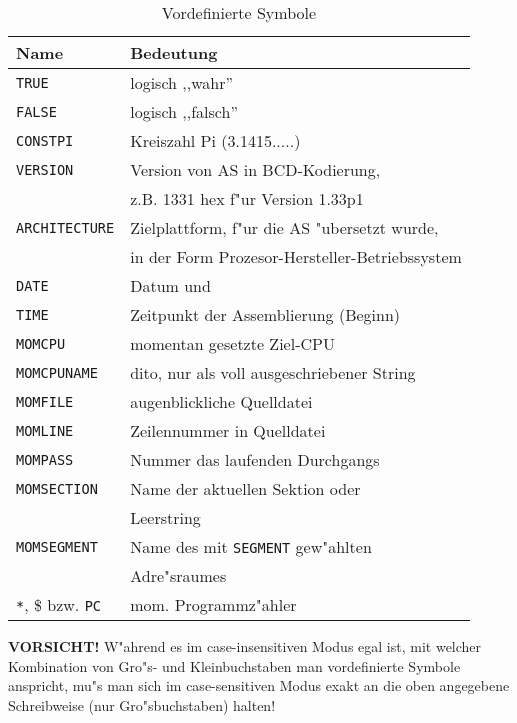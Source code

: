 \documentclass[12pt,a4paper,twoside]{report}
\newcommand{\bb}[1]{{\bf #1}}
\newcommand{\tty}[1]{{\tt #1}}
\begin{document}
\begin{table*}[p]
\begin{center}\begin{tabular}{|l|l|}
\hline
Name             & Bedeutung \\
\hline
\hline
\tty{TRUE}             & logisch ,,wahr'' \\
\tty{FALSE}            & logisch ,,falsch'' \\
\tty{CONSTPI}          & Kreiszahl Pi (3.1415.....) \\
\tty{VERSION}          & Version von AS in BCD-Kodierung, \\
                       & z.B. 1331 hex f"ur Version 1.33p1 \\
\tty{ARCHITECTURE}     & Zielplattform, f"ur die AS "ubersetzt wurde, \\
                       & in der Form Prozesor-Hersteller-Betriebssystem \\
\tty{DATE}             & Datum und \\
\tty{TIME}             & Zeitpunkt der Assemblierung (Beginn) \\
\tty{MOMCPU}           & momentan gesetzte Ziel-CPU \\
\tty{MOMCPUNAME}       & dito, nur als voll ausgeschriebener String \\
\tty{MOMFILE}          & augenblickliche Quelldatei \\
\tty{MOMLINE}          & Zeilennummer in Quelldatei \\
\tty{MOMPASS}          & Nummer das laufenden Durchgangs \\
\tty{MOMSECTION}       & Name der aktuellen Sektion oder \\
                       & Leerstring \\
\tty{MOMSEGMENT}       & Name des mit \tty{SEGMENT} gew"ahlten \\
                       & Adre"sraumes \\
\verb!*!, \$ bzw. \tty{PC} & mom. Programmz"ahler \\
\hline
\end{tabular}\end{center}
\caption{Vordefinierte Symbole\label{TabPredefined}}
\end{table*}
\bb{VORSICHT!}  W"ahrend es im case-insensitiven Modus egal ist,
mit welcher Kombination von Gro"s- und Kleinbuchstaben man 
vordefinierte Symbole anspricht, mu"s man sich im case-sensitiven
Modus exakt an die oben angegebene Schreibweise (nur Gro"sbuchstaben)
halten!
\par
\end{document}
